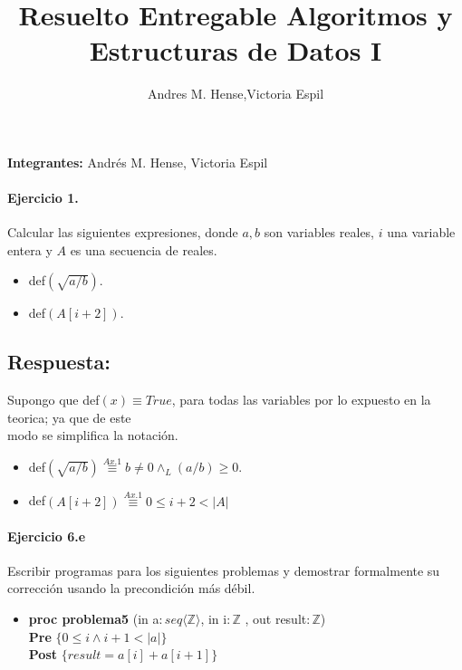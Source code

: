 \documentclass[a4paper]{article}
\title{Resuelto Entregable Algoritmos y Estructuras de Datos I}
\author{Andres M. Hense,Victoria Espil}
\date{}
\begin{document}




\begin{center}
\textbf{Integrantes:} Andrés M. Hense, Victoria Espil
\end{center}

\paragraph{Ejercicio 1.} Calcular las siguientes expresiones, donde $a, b$ son variables 
reales, $i$ una variable entera y $A$ es una secuencia
de reales.
\begin{itemize}
\item def$( \sqrt{a/b}).$
\item def$(A[i + 2]).$
\end{itemize}

\subsection*{Respuesta:}
Supongo que def$(x)\equiv True$, para todas las variables por lo expuesto en la teorica;
ya que de este\\ \hspace*{4mm} modo se simplifica la notación.

\begin{itemize}
  \item def$( \sqrt{a/b})\stackrel{Ax.1}{\equiv} b\neq 0\wedge_L (a/b)\geq 0$.
  \item def$(A[i + 2])\stackrel{Ax.1}{\equiv} 0\leq i+2 < |A|$
\end{itemize}

\paragraph{Ejercicio 6.e}Escribir programas para los siguientes problemas y demostrar 
formalmente su corrección usando la precondición
más débil.

\begin{itemize}
\item \textbf{proc problema5 }(in a$: seq\langle \mathbb{Z}\rangle$, in i$:\mathbb{Z}$
	, out result$: \mathbb{Z}$) {\\
   \hspace*{6mm} \textbf{Pre }$\{0 \leq i \wedge i + 1 < |a|\}$\\
   \hspace*{6mm} \textbf{Post }$\{result = a[i] + a[i + 1]\}$\\
   }
\end{itemize}
\end{document}

